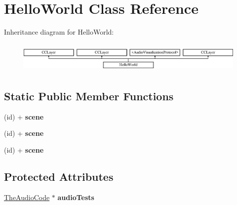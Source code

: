 \hypertarget{interface_hello_world}{\section{Hello\-World Class Reference}
\label{interface_hello_world}
}
Inheritance diagram for Hello\-World\-:\begin{figure}[H]
\begin{center}
\leavevmode
\includegraphics[height=1.513514cm]{interface_hello_world}
\end{center}
\end{figure}
\subsection*{Static Public Member Functions}
\begin{DoxyCompactItemize}
\item 
\hypertarget{interface_hello_world_ad4a0819f2a6b47bd9332afe9d6007074}{(id) + {\bfseries scene}}\label{interface_hello_world_ad4a0819f2a6b47bd9332afe9d6007074}

\item 
\hypertarget{interface_hello_world_ad4a0819f2a6b47bd9332afe9d6007074}{(id) + {\bfseries scene}}\label{interface_hello_world_ad4a0819f2a6b47bd9332afe9d6007074}

\item 
\hypertarget{interface_hello_world_ad4a0819f2a6b47bd9332afe9d6007074}{(id) + {\bfseries scene}}\label{interface_hello_world_ad4a0819f2a6b47bd9332afe9d6007074}

\end{DoxyCompactItemize}
\subsection*{Protected Attributes}
\begin{DoxyCompactItemize}
\item 
\hypertarget{interface_hello_world_a2f761ca8e1565cfe7d76cc7beb9a1a54}{\hyperlink{interface_the_audio_code}{The\-Audio\-Code} $\ast$ {\bfseries audio\-Tests}}\label{interface_hello_world_a2f761ca8e1565cfe7d76cc7beb9a1a54}

\end{DoxyCompactItemize}


